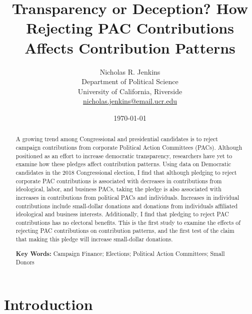 \documentclass[12pt]{article}
\title{\textbf{Transparency or Deception? How Rejecting PAC Contributions Affects Contribution Patterns}}
\author{Nicholas R. Jenkins \\ Department of Political Science\\ University of California, Riverside\\ \href{mailto:nicholas.jenkins@email.ucr.edu}{nicholas.jenkins@email.ucr.edu}}
\date{\today}
\begin{document}
\maketitle
\thispagestyle{empty}

\begin{abstract}

A growing trend among Congressional and presidential candidates is to reject campaign contributions from corporate Political Action Committees (PACs). Although positioned as an effort to increase democratic transparency, researchers have yet to examine how these pledges affect contribution patterns. Using data on Democratic candidates in the 2018 Congressional election, I find that although pledging to reject corporate PAC contributions is associated with decreases in contributions from ideological, labor, and business PACs, taking the pledge is also associated with increases in contributions from political PACs and individuals. Increases in individual contributions include small-dollar donations and donations from individuals affiliated ideological and business interests. Additionally, I find that pledging to reject PAC contributions has no electoral benefits. This is the first study to examine the effects of rejecting PAC contributions on contribution patterns, and the first test of the claim that making this pledge will increase small-dollar donations.

\medskip

\noindent \textbf{Key Words:} Campaign Finance; Elections; Political Action Committees; Small Donors

\end{abstract}

\pagebreak

\cleardoublepage
\setcounter{page}{1}

\doublespacing

\section{Introduction} \label{sec: intro}
\end{document}
